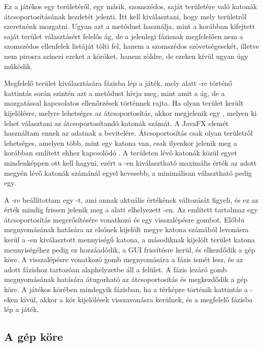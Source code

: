 Ez a játékos egy területéről, egy másik, szomszédos, saját területére való katonák átcsoportosításának kezdetét jelenti.
Itt kell kiválasztani, hogy mely területről szeretnénk mozgatni.
Ugyan azt a metódust használja, mint a korábban kifejtett saját terület választásért felelős  ág, de a jelenlegi fázisnak megfelelően nem a szomszédos ellenfelek listáját tölti fel, hanem a szomszédos szövetségesekét, illetve nem pirosra színezi ezeket a köröket, hanem zöldre, de ezeken kívül ugyan úgy működik. 

Megfelelő terület kiválasztására  fázisba lép a játék, mely alatt -re történő kattintás során szintén azt a metódust hívja meg, mint amit a  ág, de a mozgatással kapcsolatos ellenőrzések történnek rajta.
Ha olyan terület került kijelölésre, melyre lehetséges az átcsoportosítás, akkor megjelenik egy , melyen ki lehet választani az átcsoportosítandó katonák számát.
A JavaFX  elemét használtam ennek az adatnak a bevitelére.
Átcsoportosítás csak olyan területről lehetséges, amelyen több, mint egy katona van, csak ilyenkor jelenik meg a korábban említett ehhez kapcsolódó .
A területen lévő katonák közül egyet mindenképpen ott kell hagyni, ezért a -en kiválasztható maximális érték az adott megyén lévő katonák számánál egyel kevesebb, a minimálisan választható pedig egy. 

A -re beállítottam egy -t, ami annak aktuális értékének változását figyeli, és ez az érték mindig frissen jelenik meg a  alatt elhelyezett -en. Az említett  tartalmaz egy átcsoportosítás megerősítésére vonatkozó és egy visszalépésre gombot.
Előbbi megnyomásának hatására az elsőnek kijelölt megye katona számából levonásra kerül a -en kiválasztott mennyiségű katona, a másodiknak kijelölt terület katona mennyiségéhez pedig ez hozzáadódik, a GUI frissítésre kerül, és elkezdődik a gép köre.
A visszalépésre vonatkozó gomb megnyomására a fázis ismét  lesz, és az adott fázishoz tartozóan alaphelyzetbe áll a felület.
A fázis lezáró gomb megnyomásának hatására átugorható az átcsoportosítás és megkezdődik a gép köre.
A játékos körében mindegyik fázisban, ha a térképre történik kattintás a -eken kívül, akkor a kör kijelölések visszavonásra kerülnek, és a megfelelő fázisba lép a játék. 

\subsection*{A gép köre}


